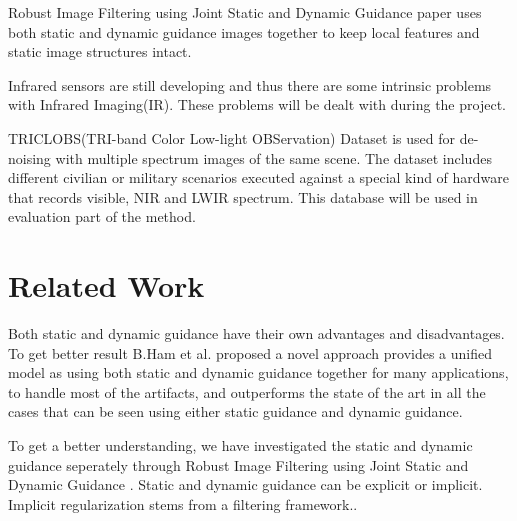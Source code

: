 \documentclass[10pt,twocolumn,letterpaper]{article}
\begin{document}
Robust Image Filtering using Joint Static and Dynamic Guidance\cite{ham2015} paper uses both static and dynamic guidance images together to keep local features and static image structures intact.

Infrared sensors are still developing and thus there are some intrinsic problems with Infrared Imaging(IR). These problems will be dealt with during the project.

TRICLOBS(TRI-band Color Low-light OBServation) Dataset\cite{triclobs} is used for de-noising with multiple spectrum images of the same scene. The dataset includes different civilian or military scenarios executed against a special kind of hardware that records visible, NIR and LWIR spectrum. This database will be used in evaluation part of the method\cite{ham2015}.

\section{Related Work}

Both static and dynamic guidance have their own advantages and disadvantages. To get better result B.Ham et al.\cite{ham2015} proposed a novel approach provides a unified model as using both static and dynamic guidance together for many applications, to handle most of the artifacts, and outperforms the state of the art in all the cases that can be seen using either static guidance and dynamic guidance.

To get a better understanding, we have investigated the static and dynamic guidance seperately through Robust Image Filtering using Joint Static and Dynamic
Guidance\cite{ham2015} . Static and dynamic guidance can be explicit or implicit. Implicit regularization stems from a filtering framework.\cite{ham2015}. 
\end{document}
